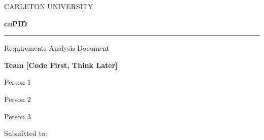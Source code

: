 \documentclass[english]{article}
\begin{document}
\newcommand{\personone}{Person 1}
\newcommand{\persontwo}{Person 2}
\newcommand{\personthree}{Person 3}
\thispagestyle{empty}

\begin{center}
CARLETON UNIVERSITY
\par\end{center}

\vspace{4cm}


\begin{center}
\textbf{{\fontsize{50pt}{50pt}\selectfont cuPID}}
\par\end{center}

\textcolor{black}{\rule[0.5ex]{0.95\columnwidth}{0.5pt}}

\begin{center}
{\LARGE{}Requirements Analysis Document}
\par\end{center}{\LARGE \par}

\vspace{5cm}


\begin{center}
\textbf{\Large{}Team {[}Code First, Think Later{]}}
\par\end{center}{\Large \par}

\begin{center}
{\large{}\personone{}}
\par\end{center}{\large \par}

\begin{center}
{\large{}\persontwo{}}
\par\end{center}{\large \par}

\begin{center}
{\large{}\personthree{}}
\par\end{center}{\large \par}

{\large{}\vspace{2cm}
}{\large \par}

\begin{center}
{\large{}Submitted to:}
\par\end{center}{\large \par}
\end{document}

